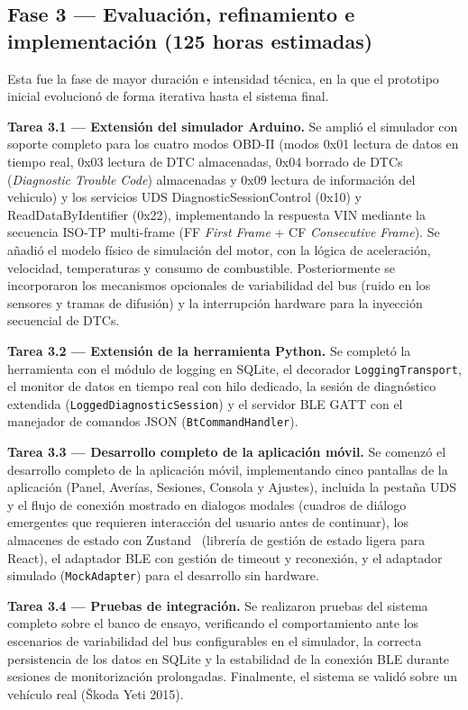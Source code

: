 \subsection{Fase 3 — Evaluación, refinamiento e implementación \textnormal{(125 horas estimadas)}}

Esta fue la fase de mayor duración e intensidad técnica, en la que el prototipo inicial evolucionó de forma iterativa hasta el sistema final.

\textbf{Tarea 3.1 — Extensión del simulador Arduino.} Se amplió el simulador con soporte completo para los cuatro modos OBD-II (modos 0x01 lectura de datos en tiempo real, 0x03 lectura de DTC almacenadas, 0x04 borrado de DTCs (\textit{Diagnostic Trouble Code}) almacenadas y 0x09 lectura de información del vehiculo) y los servicios UDS DiagnosticSessionControl (0x10) y ReadDataByIdentifier (0x22), implementando la respuesta VIN mediante la secuencia ISO-TP multi-frame (FF \textit{First Frame} + CF \textit{Consecutive Frame}). Se añadió el modelo físico de simulación del motor, con la lógica de aceleración, velocidad, temperaturas y consumo de combustible. Posteriormente se incorporaron los mecanismos opcionales de variabilidad del bus (ruido en los sensores y tramas de difusión) y la interrupción hardware para la inyección secuencial de DTCs.

\textbf{Tarea 3.2 — Extensión de la herramienta Python.} Se completó la herramienta con el módulo de logging en SQLite, el decorador \texttt{LoggingTransport}, el monitor de datos en tiempo real con hilo dedicado, la sesión de diagnóstico extendida (\texttt{LoggedDiagnosticSession}) y el servidor BLE GATT con el manejador de comandos JSON (\texttt{BtCommandHandler}).

\textbf{Tarea 3.3 — Desarrollo completo de la aplicación móvil.} Se comenzó el desarrollo completo de la aplicación móvil, implementando cinco pantallas de la aplicación (Panel, Averías, Sesiones, Consola y Ajustes), incluida la pestaña UDS y el flujo de conexión mostrado en dialogos modales (cuadros de diálogo emergentes que requieren interacción del usuario antes de continuar), los almacenes de estado con Zustand~\cite{Zustand_lib} (librería de gestión de estado ligera para React), el adaptador BLE con gestión de timeout y reconexión, y el adaptador simulado (\texttt{MockAdapter}) para el desarrollo sin hardware.

\textbf{Tarea 3.4 — Pruebas de integración.} Se realizaron pruebas del sistema completo sobre el banco de ensayo, verificando el comportamiento ante los escenarios de variabilidad del bus configurables en el simulador, la correcta persistencia de los datos en SQLite y la estabilidad de la conexión BLE durante sesiones de monitorización prolongadas. Finalmente, el sistema se validó sobre un vehículo real (Škoda Yeti 2015).

